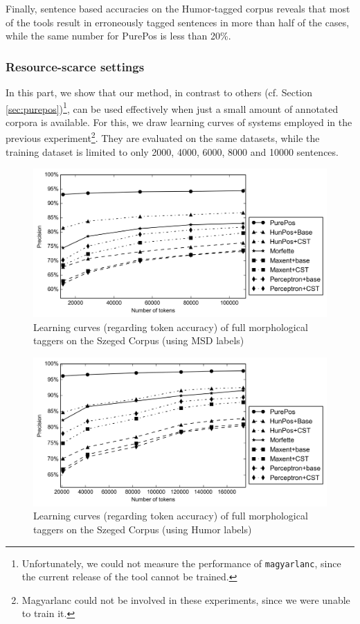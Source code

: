 Finally, sentence based accuracies on the Humor-tagged corpus reveals that most of the tools result in erroneously tagged sentences in more than half of the cases, while the same number for PurePos is less than 20\%.



\subsubsection{Resource-scarce settings}

In this part, we show that our method, in contrast to others (cf. Section \ref{sec:purepos})\footnote{Unfortunately, we could not measure the performance of \texttt{magyarlanc}, since the current release of the tool cannot be trained.}, can be used effectively when just a small amount of annotated corpora is available. 
For this, we draw learning curves of systems employed in the previous experiment\footnote{Magyarlanc could not be involved in these experiments, since we were unable to train it.}. 
They are evaluated on the same datasets, while the training dataset is limited to only 2000, 4000, 6000, 8000 and 10000 sentences. %

\begin{figure}[H]
  \centering
  \includegraphics[width=1\textwidth]{MorphTagging/msd_token.png} 
  \caption{Learning curves (regarding token accuracy) of full morphological taggers on the Szeged Corpus (using MSD labels)}
  \label{fig:msd-token}
\end{figure}

\begin{figure}[H]
  \centering
  \includegraphics[width=1\textwidth]{MorphTagging/humor_token.png}
  \caption{Learning curves (regarding token accuracy) of full morphological taggers on the Szeged Corpus (using Humor labels)}
  \label{fig:humor-token}
\end{figure}

